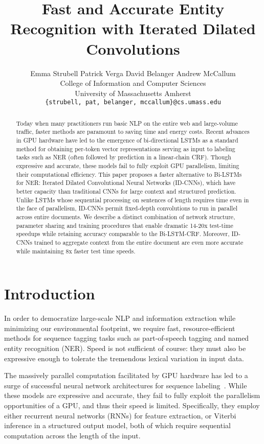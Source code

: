 \documentclass[11pt,letterpaper]{article}
\title{Fast and Accurate Entity Recognition with Iterated Dilated Convolutions}
\author{Emma Strubell \qquad Patrick Verga \qquad David Belanger \qquad Andrew McCallum\\
  College of Information and Computer Sciences \\
  University of Massachusetts Amherst \\
  {\tt \{strubell, pat, belanger, mccallum\}@cs.umass.edu}
}
\date{}
\begin{document}
\maketitle
\begin{abstract}

Today when many practitioners run basic NLP on the entire web and large-volume traffic, faster methods are paramount to saving time and energy costs.
Recent advances in GPU hardware have led to the emergence of bi-directional LSTMs as a standard method for obtaining per-token vector representations serving as input to labeling tasks such as NER (often followed by prediction in a linear-chain CRF). 
Though expressive and accurate, these models fail to fully exploit GPU parallelism, limiting their computational efficiency.
This paper proposes a faster alternative to Bi-LSTMs for NER: Iterated Dilated Convolutional Neural Networks (ID-CNNs), which have better capacity than traditional CNNs for large context and structured prediction.  
Unlike LSTMs whose sequential processing on sentences of length  requires  time even in the face of parallelism, ID-CNNs permit fixed-depth convolutions to run in parallel across entire documents.
We describe a distinct combination of network structure, parameter sharing and training procedures that enable dramatic 14-20x test-time speedups while retaining accuracy comparable to the Bi-LSTM-CRF. Moreover, ID-CNNs trained to aggregate context from the entire document are even more accurate while maintaining 8x faster test time speeds.






\end{abstract}

\section{Introduction}



In order to democratize large-scale NLP and information extraction while minimizing our environmental footprint, we require fast, resource-efficient methods for sequence tagging tasks such as part-of-speech tagging and named entity recognition (NER). Speed is not sufficient of course: they must also be expressive enough to tolerate the tremendous lexical variation in input data. 

The massively parallel computation facilitated by GPU hardware has led to a surge of successful neural network architectures for sequence labeling~\citep{ling2015finding,ma2016end,chiu2016named,lample2016neural}. While these models are expressive and accurate, they fail to fully exploit the parallelism opportunities of a GPU, and thus their speed is limited. Specifically, they employ either recurrent neural networks (RNNs) for feature extraction, or Viterbi inference in a structured output model, both of which require sequential computation across the length of the input.
\end{document}
